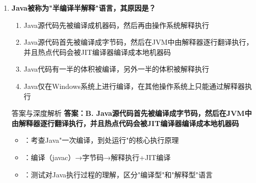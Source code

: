 \documentclass[12pt, a4paper]{ctexart}
\begin{document}
\begin{enumerate}[label=\textbf{\arabic*.}]
\begin{bluebox}{答案与深度解析}
\begin{itemize}[leftmargin=*, nosep]
			      \item {}：
			            \begin{itemize}
				            \item ClassLoader的loadClass()方法实现了双亲委派逻辑
				            \item 自定义类加载器时，通常只需重写findClass()方法
				            \item ThreadContextClassLoader：解决父类加载器无法访问子类资源的问题
			            \end{itemize}
		      \end{itemize}
	      \end{bluebox}

	      \newpage

	\item \textbf{Java被称为"半编译半解释"语言，其原因是？}
	      \begin{enumerate}[label=\Alph*.]
		      \item Java源代码先被编译成机器码，然后再由操作系统解释执行
		      \item Java源代码首先被编译成字节码，然后在JVM中由解释器逐行翻译执行，并且热点代码会被JIT编译器编译成本地机器码
		      \item Java代码有一半的体积被编译，另外一半的体积被解释执行
		      \item Java仅在Windows系统上进行编译，在其他操作系统上只能通过解释器执行
	      \end{enumerate}

	      \begin{bluebox}{答案与深度解析}
		      \textbf{答案：B. Java源代码首先被编译成字节码，然后在JVM中由解释器逐行翻译执行，并且热点代码会被JIT编译器编译成本地机器码}

		      \begin{itemize}[leftmargin=*, nosep]
			      \item {}：考查Java"一次编译，到处运行"的核心执行原理
			      \item {}：编译（javac）→字节码→解释执行+JIT编译
			      \item {}：测试对Java执行过程的理解，区分"编译型"和"解释型"语言
		      \end{itemize}



\end{bluebox}
\end{enumerate}
\end{document}
